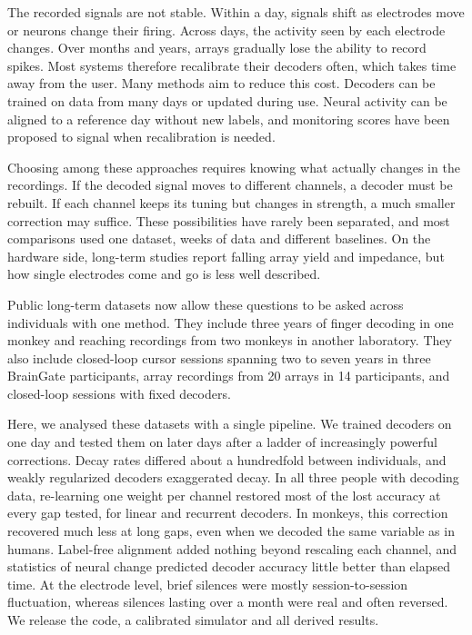 \documentclass[pdflatex,sn-nature]{sn-jnl}
\begin{document}
The recorded signals are not stable. Within a day, signals shift as electrodes move or neurons change their
firing\cite{perge2013}. Across days, the activity seen by each electrode changes\cite{chestek2011,downey2018,
bishop2014}. Over months and years, arrays gradually lose the ability to record spikes\cite{barrese2013,sponheim2021,
bjanes2025,hahn2026}. Most systems therefore recalibrate their decoders often, which takes time away from the
user\cite{jarosiewicz2015}. Many methods aim to reduce this cost. Decoders can be trained on data from many
days\cite{sussillo2016} or updated during use\cite{jarosiewicz2015,orsborn2012,dangi2013,wilson2025}. Neural activity can
be aligned to a reference day without new labels\cite{degenhart2020,gallego2020,ma2023,karpowicz2025}, and monitoring
scores have been proposed to signal when recalibration is needed\cite{pun2024}.

Choosing among these approaches requires knowing what actually changes in the recordings. If the decoded signal moves
to different channels, a decoder must be rebuilt. If each channel keeps its tuning but changes in strength, a much
smaller correction may suffice. These possibilities have rarely been separated, and most comparisons used one dataset,
weeks of data and different baselines\cite{karpowicz2024falcon}. On the hardware side, long-term studies report falling
array yield and impedance\cite{barrese2013,sponheim2021,chen2023,hahn2026}, but how single electrodes come and go is
less well described.

Public long-term datasets now allow these questions to be asked across individuals with one method. They include three
years of finger decoding in one monkey\cite{temmar2025} and reaching recordings from two monkeys in another
laboratory\cite{gallego2020,perich2018}. They also include closed-loop cursor sessions spanning two to seven years in
three BrainGate participants, array recordings from 20 arrays in 14 participants\cite{hahn2026}, and closed-loop
sessions with fixed decoders\cite{pun2024}.

Here, we analysed these datasets with a single pipeline. We trained decoders on one day and tested them on later days
after a ladder of increasingly powerful corrections. Decay rates differed about a hundredfold between individuals, and
weakly regularized decoders exaggerated decay. In all three people with decoding data, re-learning one weight per
channel restored most of the lost accuracy at every gap tested, for linear and recurrent decoders. In monkeys, this
correction recovered much less at long gaps, even when we decoded the same variable as in humans. Label-free alignment
added nothing beyond rescaling each channel, and statistics of neural change predicted decoder accuracy little better
than elapsed time. At the electrode level, brief silences were mostly session-to-session fluctuation, whereas silences
lasting over a month were real and often reversed. We release the code, a calibrated simulator and all derived
results.
\end{document}
